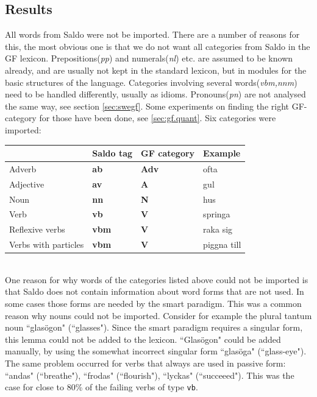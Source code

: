 \documentclass{report}
\begin{document}
\subsection{Results}
All words from Saldo were not be imported. There are a number of reasons
for this, the most obvious one is that we do not want all categories from
Saldo in the GF lexicon. Prepositions(\emph{pp}) and numerals(\emph{nl}) etc. are
assumed to be known already,
and are usually not kept in the standard lexicon, but in modules for the basic
structures of the language. Categories involving several words(\emph{vbm,nnm})
need to be handled differently, usually as idioms. Pronouns(\emph{pn}) are not  
analysed the same way, see section \ref{sec:swegf}. Some experiments on finding
the right GF-category for those have been done, see \ref{sec:gf.quant}.
Six categories were imported: \\
\begin{tabular}{l|lll}
& Saldo tag & GF category & Example \\
\hline
 Adverb & \textbf{ab} &\textbf{Adv} & ofta \\
 Adjective&\textbf{av} &    \textbf{A} & gul\\
 Noun & \textbf{nn} &\textbf{N} & hus\\
 Verb & \textbf{vb} &\textbf{V} & springa\\
 Reflexive verbs  &\textbf{vbm}& \textbf{V} & raka sig\\
 Verbs with particles &\textbf{vbm}& \textbf{V}  &  piggna till\\
\end{tabular}\\

%
One reason for why words of the categories listed above could not be imported
is that Saldo does not contain information about word forms that are not used.
In some cases those forms are needed by the smart paradigm. 
This was a common reason why nouns could not be imported. 
Consider for example
the plural tantum %
noun ``glasögon" (``glasses"). Since the smart paradigm
requires a singular form, this lemma could not be added to the lexicon. ``Glasögon" could
be added manually, by using the somewhat incorrect singular form ``glasöga" (``glass-eye").
The same problem occurred for verbs that always are used in passive form:
``andas" (``breathe"), ``frodas" (``flourish"), ``lyckas" (``succeeed"). This
was the case for close to 80\% of the failing verbs of type \verb_vb_.
\end{document}
